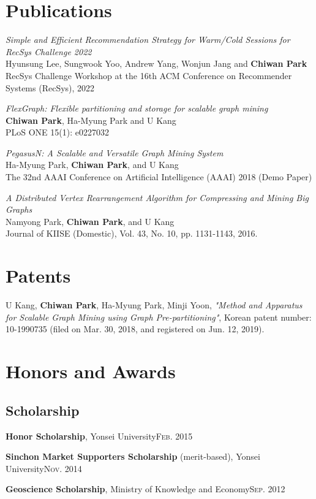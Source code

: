 \documentclass[11pt,a4paper]{article}
\renewenvironment{itemize}{
  \begin{list}{}{
    \setlength{\leftmargin}{1.5em}
    \setlength{\itemsep}{0.5em}
    \setlength{\parskip}{0pt}
    \setlength{\parsep}{0.25em}
  }
}{
  \end{list}
}
\begin{document}
\section*{Publications}
\begin{itemize}
  \item \textit{Simple and Efficient Recommendation Strategy for Warm/Cold Sessions for RecSys Challenge 2022}\\
  Hyunsung Lee, Sungwook Yoo, Andrew Yang, Wonjun Jang and \textbf{Chiwan Park}\\
  RecSys Challenge Workshop at the 16th ACM Conference on Recommender Systems (RecSys), 2022
  \item \textit{FlexGraph: Flexible partitioning and storage for scalable graph mining}\\
  \textbf{Chiwan Park}, Ha-Myung Park and U Kang\\
  PLoS ONE 15(1): e0227032
  \item \textit{PegasusN: A Scalable and Versatile Graph Mining System}\\
  Ha-Myung Park, \textbf{Chiwan Park}, and U Kang\\
  The 32nd AAAI Conference on Artificial Intelligence (AAAI) 2018 (Demo Paper)
  \item \textit{A Distributed Vertex Rearrangement Algorithm for Compressing and Mining Big Graphs}\\
  Namyong Park, \textbf{Chiwan Park}, and U Kang\\
  Journal of KIISE (Domestic), Vol. 43, No. 10, pp. 1131-1143, 2016.
\end{itemize}

\section*{Patents}
\begin{itemize}
  \item U Kang, \textbf{Chiwan Park}, Ha-Myung Park, Minji Yoon, \textit{"Method and Apparatus for Scalable Graph Mining using Graph Pre-partitioning"}, Korean patent number: 10-1990735 (filed on Mar. 30, 2018, and registered on Jun. 12, 2019).
\end{itemize}

\section*{Honors and Awards}
\subsection*{Scholarship}
\begin{itemize}
  \setlength\itemsep{0.1em}
  \item \textbf{Honor Scholarship}, Yonsei University\hfill\textsc{Feb. 2015}
  \item \textbf{Sinchon Market Supporters Scholarship} (merit-based), Yonsei University\hfill\textsc{Nov. 2014}
  \item \textbf{Geoscience Scholarship}, Ministry of Knowledge and Economy\hfill\textsc{Sep. 2012}
\end{itemize}
\end{document}
